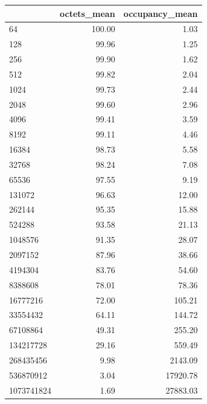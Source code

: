 \begin{tabular}{lrr}
\toprule
 & octets_mean & occupancy_mean \\
\midrule
64 & 100.00 & 1.03 \\
128 & 99.96 & 1.25 \\
256 & 99.90 & 1.62 \\
512 & 99.82 & 2.04 \\
1024 & 99.73 & 2.44 \\
2048 & 99.60 & 2.96 \\
4096 & 99.41 & 3.59 \\
8192 & 99.11 & 4.46 \\
16384 & 98.73 & 5.58 \\
32768 & 98.24 & 7.08 \\
65536 & 97.55 & 9.19 \\
131072 & 96.63 & 12.00 \\
262144 & 95.35 & 15.88 \\
524288 & 93.58 & 21.13 \\
1048576 & 91.35 & 28.07 \\
2097152 & 87.96 & 38.66 \\
4194304 & 83.76 & 54.60 \\
8388608 & 78.01 & 78.36 \\
16777216 & 72.00 & 105.21 \\
33554432 & 64.11 & 144.72 \\
67108864 & 49.31 & 255.20 \\
134217728 & 29.16 & 559.49 \\
268435456 & 9.98 & 2143.09 \\
536870912 & 3.04 & 17920.78 \\
1073741824 & 1.69 & 27883.03 \\
\bottomrule
\end{tabular}
